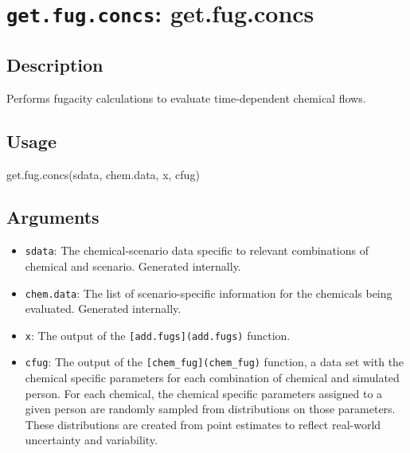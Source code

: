 \documentclass[
]{article}
\newenvironment{Shaded}{\begin{snugshade}}{\end{snugshade}}
\newcommand{\FunctionTok}[1]{\textcolor[rgb]{0.00,0.00,0.00}{#1}}
\newcommand{\NormalTok}[1]{#1}
\providecommand{\tightlist}{%
  \setlength{\itemsep}{0pt}\setlength{\parskip}{0pt}}
\begin{document}
\hypertarget{get.fug.concs-get.fug.concs}{%
\section{\texorpdfstring{\texttt{get.fug.concs}:
get.fug.concs}{get.fug.concs: get.fug.concs}}\label{get.fug.concs-get.fug.concs}}

\hypertarget{description-25}{%
\subsection{Description}\label{description-25}}

Performs fugacity calculations to evaluate time-dependent chemical
flows.

\hypertarget{usage-25}{%
\subsection{Usage}\label{usage-25}}

\begin{Shaded}
\begin{Highlighting}[]
\FunctionTok{get.fug.concs}\NormalTok{(sdata, chem.data, x, cfug)}
\end{Highlighting}
\end{Shaded}

\hypertarget{arguments-22}{%
\subsection{Arguments}\label{arguments-22}}

\begin{itemize}
\tightlist
\item
  \texttt{sdata}: The chemical-scenario data specific to relevant
  combinations of chemical and scenario. Generated internally.
\item
  \texttt{chem.data}: The list of scenario-specific information for the
  chemicals being evaluated. Generated internally.
\item
  \texttt{x}: The output of the \texttt{{[}add.fugs{]}(add.fugs)}
  function.
\item
  \texttt{cfug}: The output of the \texttt{{[}chem\_fug{]}(chem\_fug)}
  function, a data set with the chemical specific parameters for each
  combination of chemical and simulated person. For each chemical, the
  chemical specific parameters assigned to a given person are randomly
  sampled from distributions on those parameters. These distributions
  are created from point estimates to reflect real-world uncertainty and
  variability.
\end{itemize}
\end{document}

